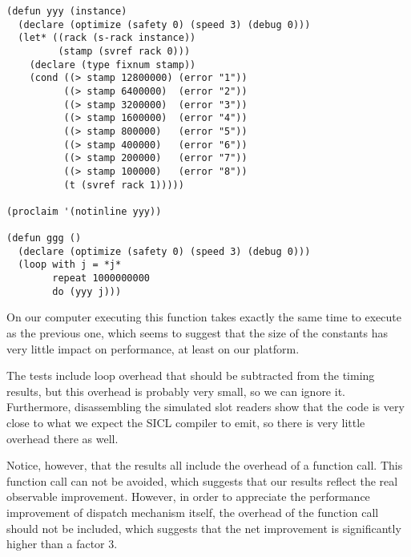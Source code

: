 \begin{verbatim}
(defun yyy (instance)
  (declare (optimize (safety 0) (speed 3) (debug 0)))
  (let* ((rack (s-rack instance))
         (stamp (svref rack 0)))
    (declare (type fixnum stamp))
    (cond ((> stamp 12800000) (error "1"))
          ((> stamp 6400000)  (error "2"))
          ((> stamp 3200000)  (error "3"))
          ((> stamp 1600000)  (error "4"))
          ((> stamp 800000)   (error "5"))
          ((> stamp 400000)   (error "6"))
          ((> stamp 200000)   (error "7"))
          ((> stamp 100000)   (error "8"))
          (t (svref rack 1)))))

(proclaim '(notinline yyy))

(defun ggg ()
  (declare (optimize (safety 0) (speed 3) (debug 0)))
  (loop with j = *j*
        repeat 1000000000
        do (yyy j)))
\end{verbatim}

On our computer executing this function takes exactly the same time to
execute as the previous one, which seems to suggest that the size of
the constants has very little impact on performance, at least on our
platform.

The tests include loop overhead that should be subtracted from the
timing results, but this overhead is probably very small, so we can
ignore it.  Furthermore, disassembling the simulated slot readers show
that the code is very close to what we expect the SICL compiler to
emit, so there is very little overhead there as well.  

Notice, however, that the results all include the overhead of a
function call.  This function call can not be avoided, which suggests
that our results reflect the real observable improvement.  However,
in order to appreciate the performance improvement of dispatch
mechanism itself, the overhead of the function call should not be
included, which suggests that the net improvement is significantly
higher than a factor $3$. 



